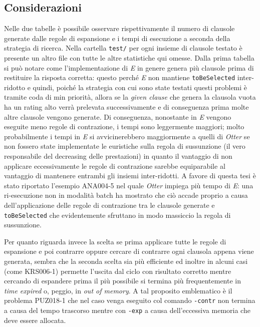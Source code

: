 \documentclass[a4paper,11pt]{article}
\begin{document}
\subsection{Considerazioni}
Nelle due tabelle è possibile osservare rispettivamente il numero di clausole generate dalle regole di espansione e i tempi di esecuzione a seconda della strategia di ricerca. Nella cartella \texttt{test/} per ogni insieme di clausole testato è presente un altro file con tutte le altre statistiche qui omesse.
Dalla prima tabella si può notare come l'implementazione di \emph{E} in genere genera più clausole prima di restituire la risposta corretta: questo perché \emph{E} non mantiene \texttt{toBeSelected} inter-ridotto e quindi, poiché la strategia con cui sono state testati questi problemi è tramite coda di min priorità, allora se la \emph{given clause} che genera la clausola vuota ha un rating alto verrà prelevata successivamente e di conseguenza prima molte altre clausole vengono generate. Di conseguenza, nonostante in \emph{E} vengono eseguite meno regole di contrazione,  i tempi sono leggermente maggiori; molto probabilmente i tempi in \emph{E} si avvicinerebbero maggiormente a quelli di \emph{Otter} se non fossero state implementate le euristiche sulla regola di sussunzione (il vero responsabile del decreasing delle prestazioni) in quanto il vantaggio di non applicare eccessivamente le regole di contrazione sarebbe equiparabile al vantaggio di mantenere entrambi gli insiemi inter-ridotti. A favore di questa tesi è stato riportato l'esempio ANA004-5 nel quale  \emph{Otter} impiega più tempo di \emph{E}: una ri-esecuzione non in modalità batch ha mostrato che ciò accade proprio a causa dell'applicazione delle regole di contrazione tra le clausole generate e \texttt{toBeSelected} che evidentemente sfruttano in modo massiccio la regola di sussunzione.\par
Per quanto riguarda invece la scelta se prima applicare tutte le regole di espansione e poi contrarre oppure cercare di contrarre ogni clausola appena viene generata, sembra che la seconda scelta sia più efficiente ed inoltre in alcuni casi (come KRS006-1) permette l'uscita dal ciclo con risultato corretto mentre cercando di espandere prima il più possibile si termina più frequentemente in \emph{time expired} o, peggio, in \emph{out of memory}. A tal proposito emblematico è il problema PUZ018-1 che nel caso venga eseguito col comando \texttt{-contr} non termina a causa del tempo trascorso mentre con \texttt{-exp} a causa dell'eccessiva memoria che deve essere allocata.
\end{document}
